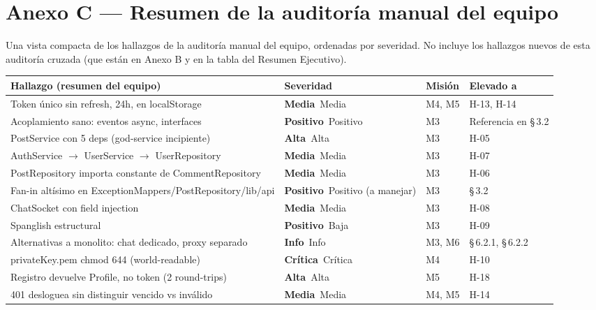 \documentclass[10pt,a4paper]{article}
\newcommand{\badgeCritica}{\colorbox{red!20}{\textcolor{red!80!black}{\textbf{\footnotesize Crítica}}}}
\newcommand{\badgeAlta}{\colorbox{orange!20}{\textcolor{orange!90!black}{\textbf{\footnotesize Alta}}}}
\newcommand{\badgeMedia}{\colorbox{yellow!35}{\textcolor{brown!90!black}{\textbf{\footnotesize Media}}}}
\newcommand{\badgeInfo}{\colorbox{gray!20}{\textcolor{gray!80!black}{\textbf{\footnotesize Info}}}}
\newcommand{\badgePositivo}{\colorbox{green!20}{\textcolor{green!60!black}{\textbf{\footnotesize Positivo}}}}
\begin{document}
\section*{Anexo C --- Resumen de la auditoría manual del equipo}
Una vista compacta de los hallazgos de la auditoría manual del equipo, ordenadas por severidad. No incluye los hallazgos nuevos de esta auditoría cruzada (que están en Anexo B y en la tabla del Resumen Ejecutivo).\par\vspace{0.4em}
\begin{table}[htbp]
\centering\small
\begin{tabularx}{\textwidth}{X p{2.2cm} p{1.5cm} p{2.5cm}}
\rowcolor{tableheader}\toprule
Hallazgo (resumen del equipo) & Severidad & Misión & Elevado a \\ \midrule
Token único sin refresh, 24h, en localStorage & \badgeMedia\  Media & M4, M5 & H-13, H-14 \\ \midrule
Acoplamiento sano: eventos async, interfaces & \badgePositivo\  Positivo & M3 & Referencia en \S\,3.2 \\ \midrule
PostService con 5 deps (god-service incipiente) & \badgeAlta\  Alta & M3 & H-05 \\ \midrule
AuthService $\rightarrow$ UserService $\rightarrow$ UserRepository & \badgeMedia\  Media & M3 & H-07 \\ \midrule
PostRepository importa constante de CommentRepository & \badgeMedia\  Media & M3 & H-06 \\ \midrule
Fan-in altísimo en ExceptionMappers/PostRepository/lib/api & \badgePositivo\  Positivo (a manejar) & M3 & \S\,3.2 \\ \midrule
ChatSocket con field injection & \badgeMedia\  Media & M3 & H-08 \\ \midrule
Spanglish estructural & \badgePositivo\  Baja & M3 & H-09 \\ \midrule
Alternativas a monolito: chat dedicado, proxy separado & \badgeInfo\  Info & M3, M6 & \S\,6.2.1, \S\,6.2.2 \\ \midrule
privateKey.pem chmod 644 (world-readable) & \badgeCritica\  Crítica & M4 & H-10 \\ \midrule
Registro devuelve Profile, no token (2 round-trips) & \badgeAlta\  Alta & M5 & H-18 \\ \midrule
401 desloguea sin distinguir vencido vs inválido & \badgeMedia\  Media & M4, M5 & H-14 \\ \midrule

\end{tabularx}
\end{table}
\end{document}
